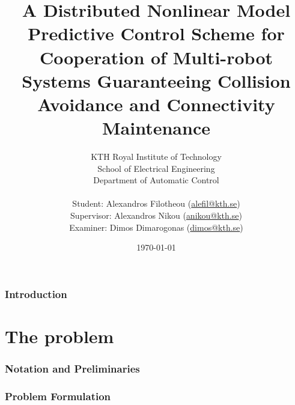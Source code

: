 \documentclass[a4paper,10pt,twoside]{article}
\title{\textbf{A Distributed Nonlinear Model Predictive Control Scheme for
Cooperation of Multi-robot Systems Guaranteeing Collision Avoidance and
Connectivity Maintenance}}
\author{KTH Royal Institute of Technology \\
  School of Electrical Engineering \\
  Department of Automatic Control \\ \\
Student: Alexandros Filotheou (\href{mailto: alefil@kth.se}{alefil@kth.se}) \\
Supervisor: Alexandros Nikou (\href{mailto: anikou@kth.se}{anikou@kth.se}) \\
Examiner: Dimos Dimarogonas (\href{mailto: dimos@kth.se}{dimos@kth.se}) \\}
\date{\today}
\begin{document}
\maketitle


\cleardoublepage
\tableofcontents
\cleardoublepage


\section{Introduction}

  
  \cleardoublepage

\part{The problem}
\cleardoublepage

  \section{Notation and Preliminaries}
    \label{sec:notation_reliminaries}

    
    
    
    \cleardoublepage


  \section{Problem Formulation}
    \label{sec:prob_formulation}
\end{document}

